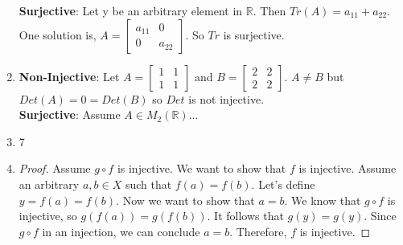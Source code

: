 \documentclass{article}
\theoremstyle{problem}
\theoremstyle{plain}
\theoremstyle{remark}
\begin{document}
\begin{enumerate}
      \textbf{Surjective}: Let y be an arbitrary element in $\mathbb{R}$. Then $Tr(A) = a_{11} + a_{22}$. One solution is, $A = 
      \begin{bmatrix}
        a_{11} & 0\\
        0 & a_{22}
      \end{bmatrix}$. So $Tr$ is surjective. 

    \item \textbf{Non-Injective}: Let $A = 
      \begin{bmatrix}
        1 & 1\\
        1 & 1
      \end{bmatrix}$
      and $B =
      \begin{bmatrix}
        2 & 2\\
        2 & 2
      \end{bmatrix}$. $A \not = B$ but $Det(A) = 0 = Det(B)$ so $Det$ is not injective.\\
      \textbf{Surjective}: Assume $A \in M_2(\mathbb{R})$...
    \item 7
    \item \begin{proof}
        Assume $g \circ f$ is injective. 
        We want to show that $f$ is injective. 
        Assume an arbitrary $a,b \in X$ such that $f(a) = f(b)$. 
        Let's define $y = f(a) = f(b)$. 
        Now we want to show that $a = b$. 
        We know that $g \circ f$ is injective, so $g(f(a)) = g(f(b))$. 
        It follows that $g(y) = g(y)$. 
        Since $g \circ f$ in an injection, we can conclude $a = b$. 
        Therefore, $f$ is injective.
      \end{proof}
    \end{enumerate}
\end{document}
